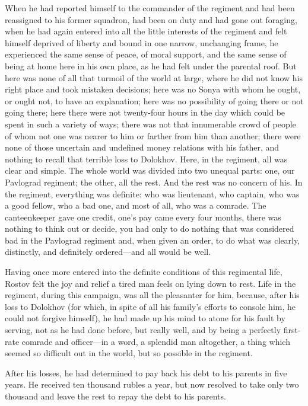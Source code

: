 When he had reported himself to the commander of the regiment and
had been reassigned to his former squadron, had been on duty and
had gone out foraging, when he had again entered into all the
little interests of the regiment and felt himself deprived of
liberty and bound in one narrow, unchanging frame, he experienced
the same sense of peace, of moral support, and the same sense of
being at home here in his own place, as he had felt under the
parental roof. But here was none of all that turmoil of the world
at large, where he did not know his right place and took mistaken
decisions; here was no Sonya with whom he ought, or ought not, to
have an explanation; here was no possibility of going there or
not going there; here there were not twenty-four hours in the day
which could be spent in such a variety of ways; there was not
that innumerable crowd of people of whom not one was nearer to
him or farther from him than another; there were none of those
uncertain and undefined money relations with his father, and
nothing to recall that terrible loss to Dolokhov. Here, in the
regiment, all was clear and simple. The whole world was divided
into two unequal parts: one, our Pavlograd regiment; the other,
all the rest. And the rest was no concern of his.  In the
regiment, everything was definite: who was lieutenant, who
captain, who was a good fellow, who a bad one, and most of all,
who was a comrade. The canteenkeeper gave one credit, one's pay
came every four months, there was nothing to think out or decide,
you had only to do nothing that was considered bad in the
Pavlograd regiment and, when given an order, to do what was
clearly, distinctly, and definitely ordered---and all would be
well.

Having once more entered into the definite conditions of this
regimental life, Rostov felt the joy and relief a tired man feels
on lying down to rest. Life in the regiment, during this
campaign, was all the pleasanter for him, because, after his loss
to Dolokhov (for which, in spite of all his family's efforts to
console him, he could not forgive himself), he had made up his
mind to atone for his fault by serving, not as he had done
before, but really well, and by being a perfectly first-rate
comrade and officer---in a word, a splendid man altogether, a
thing which seemed so difficult out in the world, but so possible
in the regiment.

After his losses, he had determined to pay back his debt to his
parents in five years. He received ten thousand rubles a year,
but now resolved to take only two thousand and leave the rest to
repay the debt to his parents.

